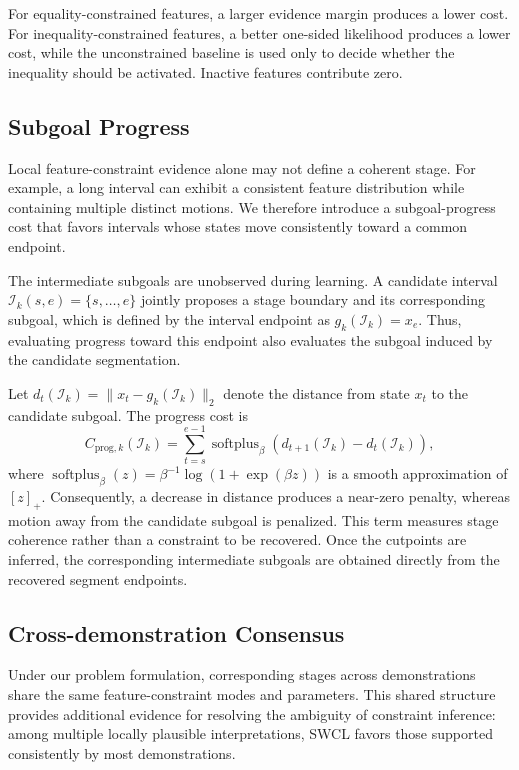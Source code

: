 \documentclass[lettersize,journal]{IEEEtran}
\begin{document}
For equality-constrained features, a larger evidence margin produces a lower cost. For inequality-constrained features, a better one-sided likelihood produces a lower cost, while the unconstrained baseline is used only to decide whether the inequality should be activated. Inactive features contribute zero. 


\subsection{Subgoal Progress}
\label{subsec:subgoal_progress}

Local feature-constraint evidence alone may not define a coherent stage. For example, a long interval can exhibit a consistent feature distribution while containing multiple distinct motions. We therefore introduce a subgoal-progress cost that favors intervals whose states move consistently toward a common endpoint.

The intermediate subgoals are unobserved during learning. A candidate interval $\mathcal{I}_k(s,e)=\{s,\dots,e\}$ jointly proposes a stage boundary and its corresponding subgoal, which is defined by the interval endpoint as $g_k(\mathcal{I}_k)=x_e$. Thus, evaluating progress toward this endpoint also evaluates the subgoal induced by the candidate segmentation.

Let $d_t(\mathcal{I}_k)=\|x_t-g_k(\mathcal{I}_k)\|_2$ denote the distance from state $x_t$ to the candidate subgoal. The progress cost is
\begin{equation}
C_{\mathrm{prog},k}(\mathcal{I}_k)
=
\sum_{t=s}^{e-1}
\operatorname{softplus}_{\beta}
\left(
d_{t+1}(\mathcal{I}_k)
-
d_t(\mathcal{I}_k)
\right),
\label{eq:progress_cost}
\end{equation}
where $\operatorname{softplus}_{\beta}(z)=\beta^{-1}\log(1+\exp(\beta z))$ is a smooth approximation of $[z]_+$. Consequently, a decrease in distance produces a near-zero penalty, whereas motion away from the candidate subgoal is penalized. This term measures stage coherence rather than a constraint to be recovered. Once the cutpoints are inferred, the corresponding intermediate subgoals are obtained directly from the recovered segment endpoints.


\subsection{Cross-demonstration Consensus}
\label{subsec:consensus_terms}

Under our problem formulation, corresponding stages across demonstrations share the same feature-constraint modes and parameters. This shared structure provides additional evidence for resolving the ambiguity of constraint inference: among multiple locally plausible interpretations, SWCL favors those supported consistently by most demonstrations.  
\end{document}
